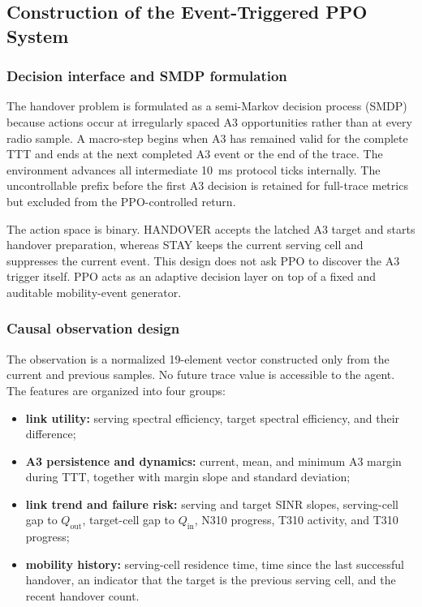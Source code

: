 \subsection{Construction of the Event-Triggered PPO System}
\label{subsec:ppo-system}

\subsubsection{Decision interface and SMDP formulation}

The handover problem is formulated as a semi-Markov decision process (SMDP)
because actions occur at irregularly spaced A3 opportunities rather than at
every radio sample. A macro-step begins when A3 has remained valid for the
complete TTT and ends at the next completed A3 event or the end of the trace.
The environment advances all intermediate 10~ms protocol ticks internally.
The uncontrollable prefix before the first A3 decision is retained for
full-trace metrics but excluded from the PPO-controlled return.

The action space is binary. HANDOVER accepts the latched A3 target and starts
handover preparation, whereas STAY keeps the current serving cell and
suppresses the current event. This design does not ask PPO to discover the A3
trigger itself. PPO acts as an adaptive decision layer on top of a fixed and
auditable mobility-event generator.

\subsubsection{Causal observation design}

The observation is a normalized 19-element vector constructed only from the
current and previous samples. No future trace value is accessible to the
agent. The features are organized into four groups:

\begin{itemize}
    \item \textbf{link utility:} serving spectral efficiency, target spectral
    efficiency, and their difference;
    \item \textbf{A3 persistence and dynamics:} current, mean, and minimum A3
    margin during TTT, together with margin slope and standard deviation;
    \item \textbf{link trend and failure risk:} serving and target SINR slopes,
    serving-cell gap to $Q_{\mathrm{out}}$, target-cell gap to
    $Q_{\mathrm{in}}$, N310 progress, T310 activity, and T310 progress;
    \item \textbf{mobility history:} serving-cell residence time, time since
    the last successful handover, an indicator that the target is the previous
    serving cell, and the recent handover count.
\end{itemize}

